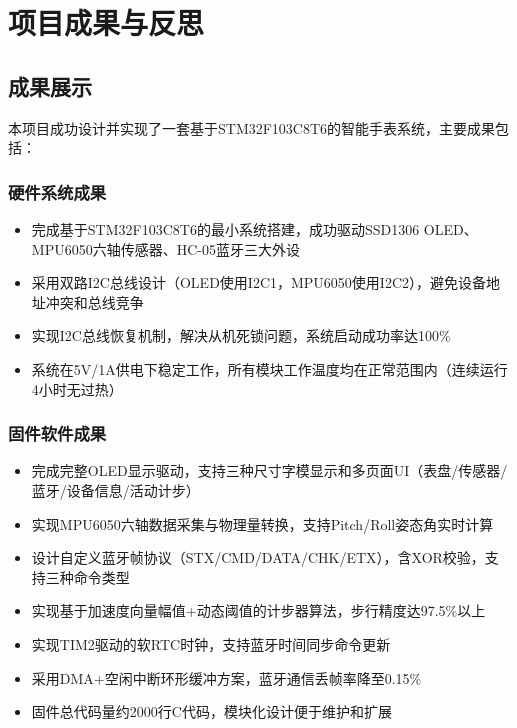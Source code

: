 
\section{项目成果与反思}

\subsection{成果展示}
本项目成功设计并实现了一套基于STM32F103C8T6的智能手表系统，主要成果包括：

\subsubsection{硬件系统成果}
\begin{itemize}
    \item 完成基于STM32F103C8T6的最小系统搭建，成功驱动SSD1306 OLED、MPU6050六轴传感器、HC-05蓝牙三大外设
    \item 采用双路I2C总线设计（OLED使用I2C1，MPU6050使用I2C2），避免设备地址冲突和总线竞争
    \item 实现I2C总线恢复机制，解决从机死锁问题，系统启动成功率达100\%
    \item 系统在5V/1A供电下稳定工作，所有模块工作温度均在正常范围内（连续运行4小时无过热）
\end{itemize}

\subsubsection{固件软件成果}
\begin{itemize}
    \item 完成完整OLED显示驱动，支持三种尺寸字模显示和多页面UI（表盘/传感器/蓝牙/设备信息/活动计步）
    \item 实现MPU6050六轴数据采集与物理量转换，支持Pitch/Roll姿态角实时计算
    \item 设计自定义蓝牙帧协议（STX/CMD/DATA/CHK/ETX），含XOR校验，支持三种命令类型
    \item 实现基于加速度向量幅值+动态阈值的计步器算法，步行精度达97.5\%以上
    \item 实现TIM2驱动的软RTC时钟，支持蓝牙时间同步命令更新
    \item 采用DMA+空闲中断环形缓冲方案，蓝牙通信丢帧率降至0.15\%
    \item 固件总代码量约2000行C代码，模块化设计便于维护和扩展
\end{itemize}

